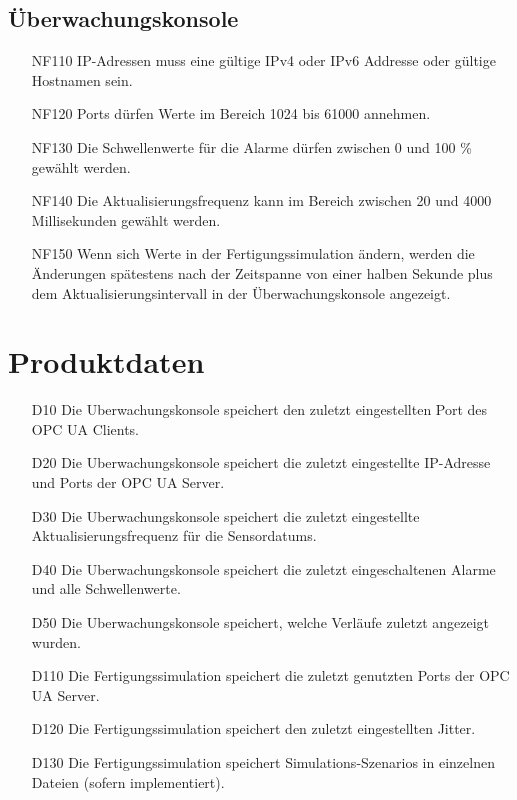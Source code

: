 \documentclass[parskip=full]{scrartcl}
\begin{document}
\subsection{Überwachungskonsole}
\begin{enumerate}
 \item[NF110] IP-Adressen muss eine gültige IPv4 oder IPv6 Addresse oder gültige Hostnamen sein. %
 \item[NF120] Ports dürfen Werte im Bereich 1024 bis 61000 annehmen.
 \item[NF130] Die Schwellenwerte für die Alarme dürfen zwischen 0 und 100 \% gewählt werden.
 \item[NF140] Die Aktualisierungsfrequenz kann im Bereich zwischen 20 und 4000 Millisekunden gewählt werden.
 \item[NF150] Wenn sich Werte in der Fertigungssimulation ändern, werden die Änderungen spätestens nach der Zeitspanne von
   einer halben Sekunde plus dem Aktualisierungsintervall in der Überwachungskonsole angezeigt.
\end{enumerate}

\pagebreak
\section{Produktdaten}
\begin{enumerate}
 \item[D10] Die \gls{Uberwachungskonsole} speichert den zuletzt eingestellten Port des \gls{OPC UA} Clients.
 \item[D20] Die \gls{Uberwachungskonsole} speichert die zuletzt eingestellte IP-Adresse und Ports der \gls{OPC UA} Server.
 \item[D30] Die \gls{Uberwachungskonsole} speichert die zuletzt eingestellte Aktualisierungsfrequenz für die \glspl{Sensordatum}.
 \item[D40] Die \gls{Uberwachungskonsole} speichert die zuletzt eingeschaltenen Alarme und alle Schwellenwerte.
 \item[D50] Die \gls{Uberwachungskonsole} speichert, welche Verläufe zuletzt angezeigt wurden.
 \item[D110] Die \gls{Fertigungssimulation} speichert die zuletzt genutzten Ports der \gls{OPC UA} Server.
 \item[D120] Die \gls{Fertigungssimulation} speichert den zuletzt eingestellten \gls{Jitter}.
 \item[D130] Die \gls{Fertigungssimulation} speichert \glspl{Simulations-Szenario} in einzelnen Dateien (sofern implementiert).
\end{enumerate}
\end{document}
